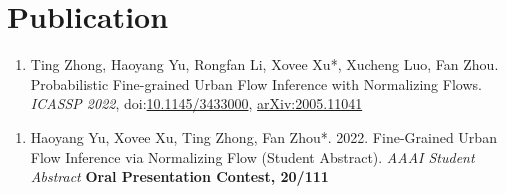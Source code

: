 \section*{Publication}


\begin{enumerate}[resume]
    \item Ting Zhong, Haoyang Yu, Rongfan Li, Xovee Xu*, Xucheng Luo, Fan Zhou. Probabilistic Fine-grained Urban Flow Inference with Normalizing Flows. \textit{ICASSP 2022}, doi:\href{papers/ICASSP_2022_FUFI.pdf}{10.1145/3433000}, \href{https://arxiv.org/abs/2005.11041}{arXiv:2005.11041}
\end{enumerate}


\begin{enumerate}[resume]
    \item Haoyang Yu, Xovee Xu, Ting Zhong, Fan Zhou*. 2022. Fine-Grained Urban Flow Inference via Normalizing Flow (Student Abstract). \textit{AAAI Student Abstract}
    \newline \textbf{\color{red}Oral Presentation Contest, 20/111}
\end{enumerate}